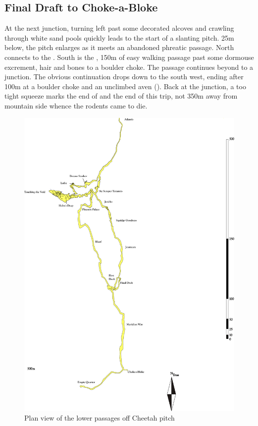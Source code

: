 \subsection{Final Draft to Choke-a-Bloke}
At the next junction, turning left past some decorated alcoves and crawling through white sand pools quickly leads to the start of a slanting pitch. 25m below, the pitch enlarges as it meets an abandoned phreatic passage. North connects to the . South is the , 150m of easy walking passage past some dormouse excrement, hair and bones to a boulder choke. The passage continues beyond to a junction. The obvious continuation drops down to the south west, ending after 100m at a boulder choke and an unclimbed aven (). Back at the junction, a too tight squeeze marks the end of  and the end of this trip, not 350m away from mountain side whence the rodents came to die.



\begin{figure}[t!]
\checkoddpage \ifoddpage \forcerectofloat \else \forceversofloat \fi
\centering
\includegraphics[width=\textwidth]{images/pdf_maps/paradisesouth.pdf}
\caption{Plan view of the lower passages off Cheetah pitch}
\label{paradise}
\end{figure}